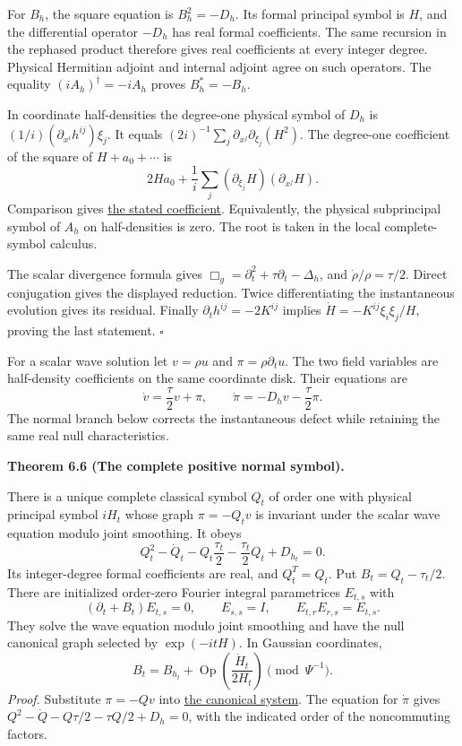 \documentclass[
  english,
  11pt,
  reqno]{amsart}
\makeatletter
\newcommand{\pandocstatementheading}[1]{%
  \par\if@nobreak\else
    \addpenalty{\@beginparpenalty}%
    \addvspace{.5\baselineskip plus .2\baselineskip minus .2\baselineskip}%
  \fi
  {\normalfont\bfseries #1\par}%
  \nobreak\@afterindenttrue\@afterheading
}
\makeatother
\begin{document}
For \(B_h\), the square equation is \(B_h^2=-D_h\). Its formal principal
symbol is \(H\), and the differential operator \(-D_h\) has real formal
coefficients. The same recursion in the rephased product therefore gives
real coefficients at every integer degree. Physical Hermitian adjoint
and internal adjoint agree on such operators. The equality
\((iA_h)^\dagger=-iA_h\) proves \(B_h^*=-B_h\).

In coordinate half-densities the degree-one physical symbol of \(D_h\)
is \((1/i)(\partial_{x^i}h^{ij})\xi_j\). It equals
\((2i)^{-1}\sum_j\partial_{x^j}\partial_{\xi_j}(H^2)\). The degree-one
coefficient of the square of \(H+a_0+\cdots\) is \[
2Ha_0+\frac1i\sum_j
(\partial_{\xi_j}H)(\partial_{x^j}H).
\] Comparison gives \hyperref[eq:online-wave-root-subprincipal]{the
stated coefficient}. Equivalently, the physical subprincipal symbol of
\(A_h\) on half-densities is zero. The root is taken in the local
complete-symbol calculus.

The scalar divergence formula gives
\(\Box_g=\partial_t^2+\tau\partial_t-\Delta_h\), and
\(\dot\rho/\rho=\tau/2\). Direct conjugation gives the displayed
reduction. Twice differentiating the instantaneous evolution gives its
residual. Finally \(\partial_t h^{ij}=-2K^{ij}\) implies
\(\dot H=-K^{ij}\xi_i\xi_j/H\), proving the last statement.
\hfill\(\square\)

For a scalar wave solution let \(v=\rho u\) and \(\pi=\rho\partial_tu\).
The two field variables are half-density coefficients on the same
coordinate disk. Their equations are%
 \[
\dot v=\frac{\tau}{2}v+\pi,
\qquad
\dot\pi=-D_hv-\frac{\tau}{2}\pi.
\] The normal branch below corrects the instantaneous defect while
retaining the same real null characteristics.

\pandocstatementheading{\leavevmode{}\label{thm:online-wave-normal-riccati}Theorem 6.6 (The complete positive normal symbol).}

There is a unique complete classical symbol \(Q_t\) of order one with
physical principal symbol \(iH_t\) whose graph \(\pi=-Q_tv\) is
invariant under the scalar wave equation modulo joint smoothing. It
obeys%
 \[
Q_t^2-\dot Q_t-Q_t\frac{\tau_t}{2}
-\frac{\tau_t}{2}Q_t+D_{h_t}=0.
\] Its integer-degree formal coefficients are real, and \(Q_t^T=Q_t\).
Put \(B_t=Q_t-\tau_t/2\). There are initialized order-zero Fourier
integral parametrices \(E_{t,s}\) with%
 \[
(\partial_t+B_t)E_{t,s}=0,\qquad E_{s,s}=I,
\qquad E_{t,r}E_{r,s}=E_{t,s}.
\] They solve the wave equation modulo joint smoothing and have the null
canonical graph selected by \(\exp(-itH)\). In Gaussian coordinates,%
 \[
B_t=B_{h_t}
+\operatorname{Op}\!\left(\frac{\dot H_t}{2H_t}\right)
\pmod{\Psi^{-1}}.
\] \emph{Proof.} Substitute \(\pi=-Qv\) into
\hyperref[eq:online-wave-canonical-cauchy-system]{the canonical system}.
The equation for \(\dot\pi\) gives
\(Q^2-\dot Q-Q\tau/2-\tau Q/2+D_h=0\), with the indicated order of the
noncommuting factors.
\end{document}
